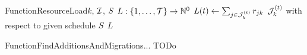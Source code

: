 \begin{alg}{Function}{ResourceLoad}{$k$, $\mathcal{I}$, $S$} \label{alg:resource-load}
\State $L : \{{1}, \dots, {\mathcal{T}}\} \to \mathbb{N}^0$
    \State $L(t) \gets \sum_{j \in \mathcal{J}_{k}^{(t)}} r_{j k}$
        \Comment $\mathcal{J}_{k}^{(t)}$ with respect to given schedule $S$
\EndFor
\State \Return $L$
\end{alg}


\begin{alg}{Function}{FindAdditionsAndMigrations}{...} \label{alg:find-additions-and-migrations}
\State TODo
\end{alg}


